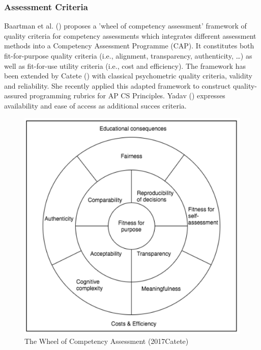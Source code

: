 \subsubsection*{Assessment Criteria}\label{sec:qualityCriteria}
Baartman et al. (\cite{baartman2006wheel}) proposes a 'wheel of competency assessment' framework of quality criteria for competency assessments which integrates different assessment methods into a Competency Assessment Programme (CAP). It constitutes both fit-for-purpose quality criteria (i.e., alignment, transparency, authenticity, \ldots) as well as fit-for-use utility criteria (i.e., cost and efficiency). The framework has been extended by Catete (\cite{catete2017framework}) with classical psychometric quality criteria, validity and reliability. She recently applied this adapted framework to construct quality-assured programming rubrics for AP CS Principles. Yadav (\cite{Yadav2015}) expresses availability and ease of access as additional succes criteria.




\begin{figure}
\includegraphics[scale=0.6]{figures/AdaptedQualityCriteriaCatete.png}
\caption{The Wheel of Competency Assessment (2017Catete)}\label{fig:AdaptedQualityCriteriaCatete}
\end{figure}



